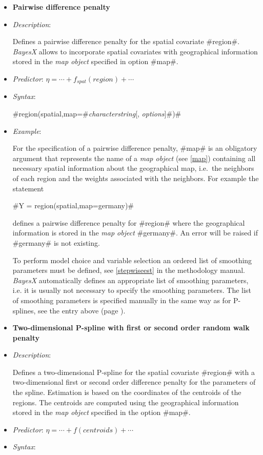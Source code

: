 \begin{itemize}
\item[]{\bf\sffamily Pairwise difference penalty}

\item[] {\em Description}:

Defines a pairwise difference penalty for the spatial covariate #region#. {\em BayesX} allows to incorporate spatial
covariates with geographical information stored in the {\em map object} specified in option #map#.
\item[] {\em Predictor}: $\eta = \cdots
+ f_{spat}(region) + \cdots$ \item[] {\em Syntax}:

#region(spatial,map=#{\em characterstring}[, {\em options}]#)#
\item[] {\em Example}:

For the specification of a pairwise difference penalty, #map# is an
obligatory argument that represents the name of a {\em map object}
(see \autoref{map}) containing all necessary spatial information
about the geographical map, i.e.~the neighbors of each region and
the weights associated with the neighbors. For example the
statement

#Y = region(spatial,map=germany)#

defines a pairwise difference penalty for #region# where the
geographical information is stored in the {\em map object}
#germany#. An error will be raised if #germany# is not existing.

To perform model choice and variable selection an ordered list of smoothing parameters must be defined, see
\autoref{stepwiseest} in the methodology manual. {\em BayesX} automatically defines an appropriate list of smoothing
parameters, i.e. it is usually not necessary to  specify the smoothing parameters. The list of smoothing parameters is
specified manually in the same way as for P-splines, see the entry above (page \pageref{psplines_stepwise}).


\item[]{\bf\sffamily Two-dimensional P-spline with first or second order
random walk penalty}

\item[] {\em Description}:

Defines a two-dimensional P-spline for the spatial covariate
#region# with a two-dimensional first or second order difference penalty
for the parameters of the spline. Estimation is based on the
coordinates of the centroids of the regions. The centroids are
computed using the geographical information stored in the {\em map
object} specified in the option #map#.
\item[] {\em Predictor}:
$\eta= \cdots + f(centroids) + \cdots$ \item[] {\em Syntax}:


\end{itemize}
